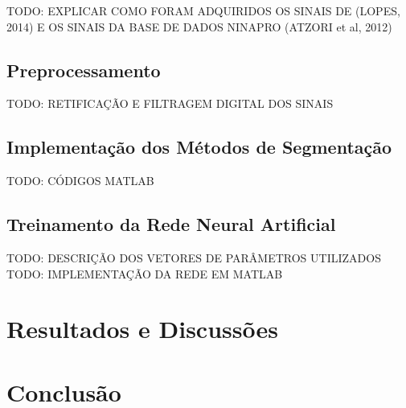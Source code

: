 \documentclass[
	12pt,				%
	openright,			%
	oneside,
	a4paper,			%
	english,			%
	francais,			%
	spanish,			%
	brazil				%
	]{abntex2}
\begin{document}
	TODO: EXPLICAR COMO FORAM ADQUIRIDOS OS SINAIS DE (LOPES, 2014) E OS SINAIS DA BASE DE DADOS NINAPRO (ATZORI et al, 2012)

\section{Preprocessamento}

	TODO: RETIFICAÇÃO E FILTRAGEM DIGITAL DOS SINAIS

\section{Implementação dos Métodos de Segmentação}

	TODO: CÓDIGOS MATLAB

\section{Treinamento da Rede Neural Artificial}

	TODO: DESCRIÇÃO DOS VETORES DE PARÂMETROS UTILIZADOS
	TODO: IMPLEMENTAÇÃO DA REDE EM MATLAB

\chapter{Resultados e Discussões}



\chapter{Conclusão}

\postextual


\end{document}

